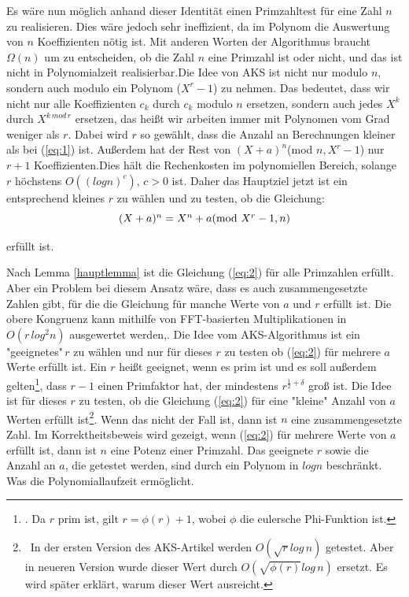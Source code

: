 \documentclass[12pt,oneside]{article}
\theoremstyle{remark}
\theoremstyle{definition}
\begin{document}
\begin{flushleft}
Es wäre nun möglich anhand dieser Identität einen Primzahltest für eine Zahl $n$ zu realisieren. Dies wäre jedoch sehr ineffizient, da im Polynom die Auswertung von $n$ Koeffizienten nötig ist. Mit anderen Worten der Algorithmus braucht $\Omega(n)$ um zu entscheiden, ob die Zahl $n$ eine Primzahl ist oder nicht, und das ist nicht in Polynomialzeit realisierbar.\newline\newline Die Idee von AKS ist nicht nur modulo $n$, sondern auch modulo ein Polynom ($X^r -1$) zu nehmen. Das bedeutet, dass wir nicht nur alle Koeffizienten $c_{k}$ durch $c_{k}$ modulo $n$ ersetzen, sondern auch jedes $X^k$ durch $X^{k \, mod \, r}$ ersetzen, das heißt wir arbeiten immer mit Polynomen vom Grad weniger als $r$. Dabei wird $r$ so gewählt, dass die Anzahl an Berechnungen kleiner als bei (\ref{eq:1}) ist. Außerdem hat der Rest von $(X + a)^n$(mod $ n, X^r - 1$) nur $ r + 1$ Koeffizienten.\newline Dies hält die Rechenkosten im polynomiellen Bereich, solange $r$ höchstens $O ((log n)^c), \, c > 0$ ist.
Daher das Hauptziel jetzt ist ein entsprechend kleines $r$ zu wählen und zu testen, ob die Gleichung:\newline\newline
\begin{equation}\label{eq:2}
    \centerline{$(X + a)^n = X^n + a $(mod $X^r - 1, n$)}
\end{equation}

erfüllt ist.\newline

Nach Lemma \ref{hauptlemma} ist die Gleichung (\ref{eq:2}) für alle Primzahlen erfüllt. Aber ein Problem bei diesem Ansatz wäre, dass es auch zusammengesetzte Zahlen gibt, für die die Gleichung für manche Werte von $a$ und $r$ erfüllt ist. Die obere Kongruenz kann mithilfe von FFT-basierten Multiplikationen in $O(r \, log^2 n)$ ausgewertet werden\cite{D73},\cite{computer-algebra}. Die Idee vom AKS-Algorithmus ist ein "geeignetes"$\, r$ zu wählen und nur für dieses $r$ zu testen ob (\ref{eq:2}) für mehrere $a$ Werte erfüllt ist. Ein $r$ heißt geeignet, wenn es prim ist und es soll außerdem gelten\footnote{. Da $r$ prim ist, gilt $r = \phi(r) + 1 $, wobei $\phi$ die eulersche Phi-Funktion ist.}, dass $r - 1$ einen Primfaktor hat, der mindestens $r^{\frac{1}{2} + \delta}$ groß ist. Die Idee ist für dieses $r$ zu testen, ob die Gleichung (\ref{eq:2}) für eine "kleine" Anzahl von $a$ Werten erfüllt ist\footnote{$\,$ In der ersten Version des AKS-Artikel werden $O(\sqrt{r}log \, n)$ getestet. Aber in neueren Version wurde dieser Wert durch $O(\sqrt{\phi(r)}log \, n)$ ersetzt. Es wird später erklärt, warum dieser Wert ausreicht.}. Wenn das nicht der Fall ist, dann ist $n$ eine zusammengesetzte Zahl. Im Korrektheitsbeweis wird gezeigt, wenn (\ref{eq:2}) für mehrere Werte von $a$ erfüllt ist, dann ist $n$ eine Potenz einer Primzahl. Das geeignete $r$ sowie die Anzahl an $a$, die getestet werden, sind durch ein Polynom in $log n$ beschränkt. Was die Polynomiallaufzeit ermöglicht.

\newpage

\end{flushleft}
\end{document}
